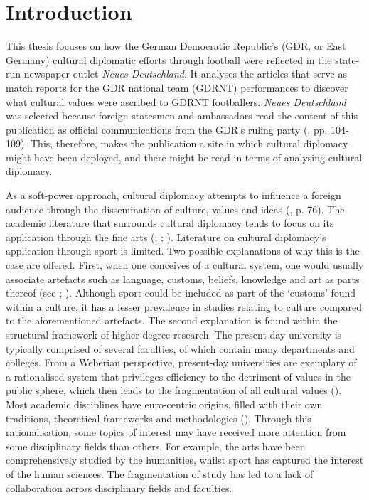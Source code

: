 \chapter*{Introduction}\label{cha:introduction}

This thesis focuses on how the German Democratic Republic’s (GDR, or East Germany) cultural diplomatic efforts through football were reflected in the state-run newspaper outlet \textit{Neues Deutschland}. It analyses the articles that serve as match reports for the GDR national team (GDRNT) performances to discover what cultural values were ascribed to GDRNT footballers. \textit{Neues Deutschland} was selected because foreign statesmen and ambassadors read the content of this publication as official communications from the GDR’s ruling party (\cite{fiedler2014}, pp. 104-109). This, therefore, makes the publication a site in which cultural diplomacy might have been deployed, and there might be read in terms of analysing cultural diplomacy.

As a soft-power approach, cultural diplomacy attempts to influence a foreign audience through the dissemination of culture, values and ideas (\cite{lenczowski2009}, p. 76). The academic literature that surrounds cultural diplomacy tends to focus on its application through the fine arts (\cite{prevots1998}; \cite{david-fox2011}; \cite{mikkonensuutari2016}). Literature on cultural diplomacy’s application through sport is limited. Two possible explanations of why this is the case are offered. First, when one conceives of a cultural system, one would usually associate artefacts such as language, customs, beliefs, knowledge and art as parts thereof (see \cite{boas1930}; \cite{tylor1958}). Although sport could be included as part of the ‘customs’ found within a culture, it has a lesser prevalence in studies relating to culture compared to the aforementioned artefacts. The second explanation is found within the structural framework of higher degree research. The present-day university is typically comprised of several faculties, of which contain many departments and colleges. From a Weberian perspective, present-day universities are exemplary of a rationalised system that privileges efficiency to the detriment of values in the public sphere, which then leads to the fragmentation of all cultural values (\cite{weber1976}). Most academic disciplines have euro-centric origins, filled with their own traditions, theoretical frameworks and methodologies (\cite{klein1990}). Through this rationalisation, some topics of interest may have received more attention from some disciplinary fields than others. For example, the arts have been comprehensively studied by the humanities, whilst sport has captured the interest of the human sciences. The fragmentation of study has led to a lack of collaboration across disciplinary fields and faculties.

